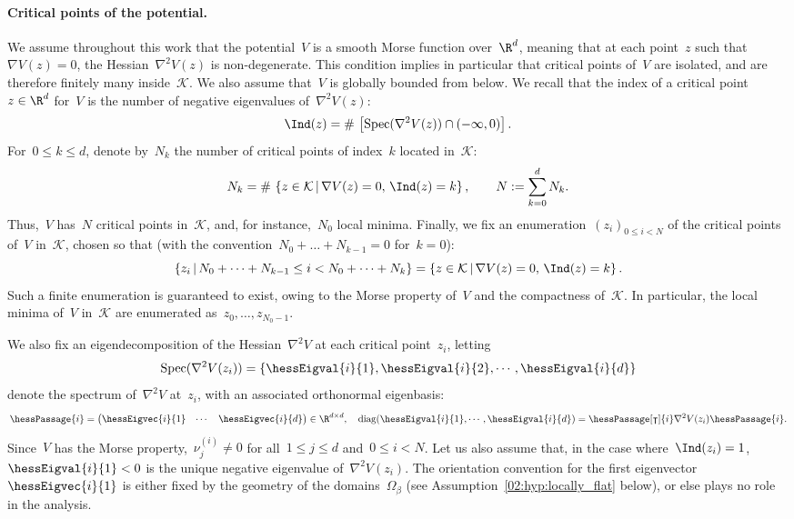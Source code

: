     \paragraph{Critical points of the potential.}
    We assume throughout this work that the potential~$V$ is a smooth Morse function over~$\R^d$, meaning that at each point~$z$ such that~$\nabla V(z)=0$, the Hessian~$\nabla^2 V(z)$ is non-degenerate.
    This condition implies in particular that critical points of~$V$ are isolated, and are therefore finitely many inside~$\mathcal K$.
    We also assume that~$V$ is globally bounded from below.
    We recall that the index of a critical point~$z\in\R^d$ for~$V$ is the number of negative eigenvalues of~$\nabla^2 V(z)$:
    \[\Ind(z) = \#\, \left[\mathrm{Spec}(\nabla^2 V(z)) \cap (-\infty,0)\right].\]
    For~$0\leq k \leq d$, denote by~$N_k$ the number of critical points of index~$k$ located in~$\mathcal K$:
    \begin{equation}
        \label{02:eq:morse_indices}
        N_k = \#\,\left\{z \in \mathcal K\,\middle|\,\nabla V(z)=0,\,\Ind(z)=k\right\},\qquad N:=\sum_{k=0}^d N_k.
    \end{equation}
    Thus,~$V$ has~$N$ critical points in~$\mathcal K$, and, for instance,~$N_0$ local minima.
    Finally, we fix an enumeration~$(z_i)_{0\leq i< N}$
    of the critical points of~$V$ in~$\mathcal K$, chosen so that (with the convention~$N_0+\dots+N_{k-1}=0$ for~$k=0$):
    \[\left\{z_i\,\middle|\,N_0+\dots+N_{k-1}\leq i <N_0+\dots+N_k\right\} = \left\{z \in \mathcal K\,\middle|\,\nabla V(z)=0,\,\Ind(z)=k\right\}.\]
    Such a finite enumeration is guaranteed to exist, owing to the Morse property of~$V$ and the compactness of~$\mathcal K$.
    In particular, the local minima of~$V$ in~$\mathcal K$ are enumerated as~$z_0,\dots,z_{N_0-1}$.

    We also fix an eigendecomposition of the Hessian~$\nabla^2 V$ at each critical point~$z_i$, letting
    \begin{equation}
        \label{02:eq:eigvals_hessian}
        \mathrm{Spec}(\nabla^2 V(z_i)) = \left\{\hessEigval{i}{1}, \hessEigval{i}{2}, \dotsm, \hessEigval{i}{d}\right\}
    \end{equation}
    denote the spectrum of~$\nabla^2 V$ at~$z_i$, with an associated orthonormal eigenbasis:
    \begin{equation}
        \label{02:eq:eigvecs_hessian}
        \hessPassage{i} =\begin{pmatrix}\hessEigvec{i}{1}&\dotsm&\hessEigvec{i}{d}\end{pmatrix}\in\R^{d\times d},\quad \mathrm{diag}(\hessEigval{i}{1},\dotsm,\hessEigval{i}{d}) = \hessPassage[\intercal]{i} \nabla^2 V(z_i) \hessPassage{i}.
    \end{equation}
    Since~$V$ has the Morse property,~$\nu_j^{(i)} \neq 0$ for all~${1\leq j\leq d}$ and~${0\leq i < N}$.
    Let us also assume that, in the case where~$\Ind(z_i)=1$,~$\hessEigval{i}{1}<0$ is the unique negative eigenvalue of~$\nabla^2 V(z_i)$. The orientation convention for the first eigenvector~$\hessEigvec{i}{1}$ is either fixed by the geometry of the domains~$\Omega_\beta$ (see Assumption~\eqref{02:hyp:locally_flat} below), or else plays no role in the analysis.
    
